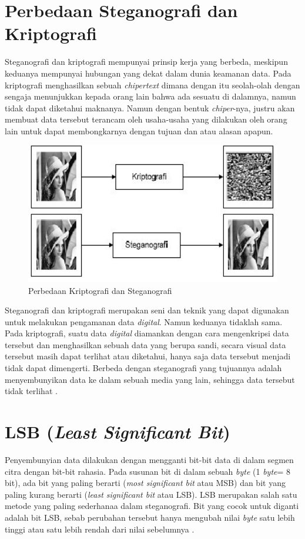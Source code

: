 \section{Perbedaan Steganografi dan Kriptografi}
Steganografi dan kriptografi mempunyai prinsip kerja yang berbeda, meskipun keduanya mempunyai hubungan yang dekat dalam dunia keamanan data. Pada kriptografi menghasilkan sebuah \emph{chipertext} dimana dengan itu seolah-olah dengan sengaja menunjukkan kepada orang lain bahwa ada sesuatu di dalamnya, namun tidak dapat diketahui maknanya. Namun dengan bentuk \emph{chiper}-nya, justru akan membuat data tersebut terancam oleh usaha-usaha yang dilakukan oleh orang lain untuk dapat membongkarnya dengan tujuan dan atau alasan apapun.
\begin{figure}[H]
	\centering
	\includegraphics[width=1\textwidth]{gambar/perbedaan_kripsteg}
	\caption{Perbedaan Kriptografi dan Steganografi}
	\label{perbedaan_kripsteg}
\end{figure}

Steganografi dan kriptografi merupakan seni dan teknik yang dapat digunakan untuk melakukan pengamanan data \emph{digital}. Namun keduanya tidaklah sama. Pada kriptografi, suatu data \emph{digital} diamankan dengan cara mengenkripsi data tersebut dan menghasilkan sebuah data yang berupa sandi, secara visual data tersebut masih dapat terlihat atau diketahui, hanya saja data tersebut menjadi tidak dapat dimengerti. Berbeda dengan steganografi yang tujuannya adalah menyembunyikan data ke dalam sebuah media yang lain, sehingga data tersebut tidak terlihat \cite{setiana}.

\section{LSB (\emph{Least Significant Bit})}
Penyembunyian data dilakukan dengan mengganti bit-bit data di dalam segmen citra dengan bit-bit rahasia. Pada susunan bit di dalam sebuah \emph{byte} (1 \emph{byte}= 8 bit), ada bit yang paling berarti (\emph{most significant bit} atau MSB) dan bit yang paling kurang berarti (\emph{least significant bit} atau LSB). LSB merupakan salah satu metode yang paling sederhanaa dalam steganografi. Bit yang cocok untuk diganti adalah bit LSB, sebab perubahan tersebut hanya mengubah nilai \emph{byte} satu lebih tinggi atau satu lebih rendah dari nilai sebelumnya \cite{munir}.

